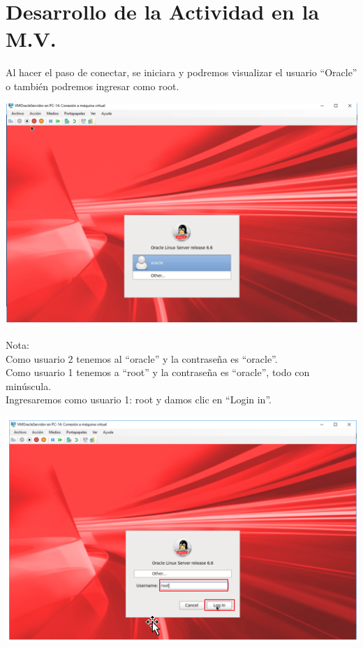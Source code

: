\section{Desarrollo de la Actividad en la M.V.} 
\vspace{\baselineskip}
Al hacer el paso de conectar, se iniciara y podremos visualizar el usuario “Oracle” o también podremos ingresar como root. 
	\begin{center}
		\includegraphics[width=14cm]{./Imagenes/27} 
	\end{center} 

\vspace{\baselineskip}

Nota: \\
Como usuario 2 tenemos al “oracle” y la contraseña es “oracle”. \\
Como usuario 1 tenemos a “root” y la contraseña es “oracle”, todo con minúscula. 
\\
Ingresaremos como usuario 1: root y damos clic en “Login in”.
	\begin{center}
		\includegraphics[width=14cm]{./Imagenes/28} 
	\end{center} 

